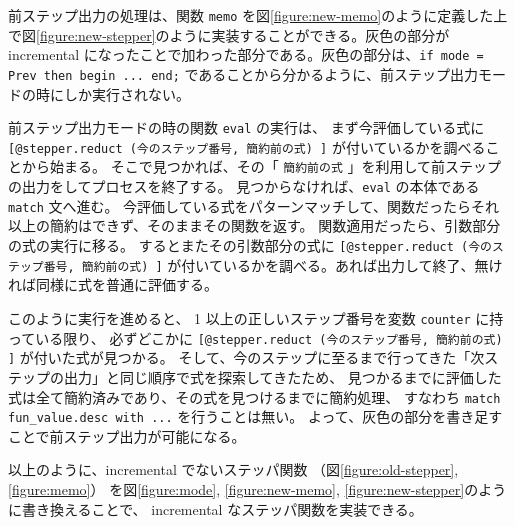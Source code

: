 前ステップ出力の処理は、関数 \texttt{memo} を図\ref{figure:new-memo}のように定義した上で図\ref{figure:new-stepper}のように実装することができる。灰色の部分が incremental になったことで加わった部分である。灰色の部分は、\texttt{if mode = Prev then begin ... end;} であることから分かるように、前ステップ出力モードの時にしか実行されない。

前ステップ出力モードの時の関数 \texttt{eval} の実行は、
まず今評価している式に
\texttt{[@stepper.reduct (今のステップ番号, 簡約前の式) ]}
が付いているかを調べることから始まる。
そこで見つかれば、その「 \texttt{簡約前の式} 」を利用して前ステップの出力をしてプロセスを終了する。
見つからなければ、\texttt{eval} の本体である \texttt{match} 文へ進む。
今評価している式をパターンマッチして、関数だったらそれ以上の簡約はできず、そのままその関数を返す。
関数適用だったら、引数部分の式の実行に移る。
するとまたその引数部分の式に
\texttt{[@stepper.reduct (今のステップ番号, 簡約前の式) ]}
が付いているかを調べる。あれば出力して終了、無ければ同様に式を普通に評価する。

このように実行を進めると、
1 以上の正しいステップ番号を変数 \texttt{counter} に持っている限り、
必ずどこかに \texttt{[@stepper.reduct (今のステップ番号, 簡約前の式) ]} が付いた式が見つかる。
そして、今のステップに至るまで行ってきた「次ステップの出力」と同じ順序で式を探索してきたため、
見つかるまでに評価した式は全て簡約済みであり、その式を見つけるまでに簡約処理、
すなわち \texttt{match fun\_value.desc with ...} を行うことは無い。
よって、灰色の部分を書き足すことで前ステップ出力が可能になる。

以上のように、incremental でないステッパ関数
（図\ref{figure:old-stepper}, \ref{figure:memo}）
を図\ref{figure:mode}, \ref{figure:new-memo}, \ref{figure:new-stepper}のように書き換えることで、
incremental なステッパ関数を実装できる。
